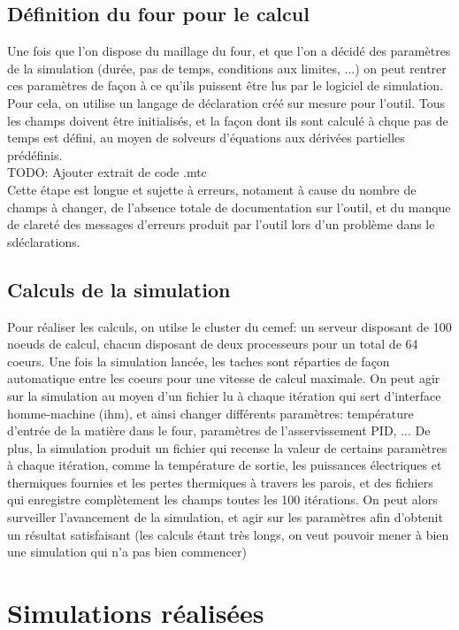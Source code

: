 \documentclass[12pt, a4paper, french, BCOR = 0pt, DIV = 10]{scrartcl}
\begin{document}
    \subsection{Définition du four pour le calcul}
    Une fois que l'on dispose du maillage du four, et que l'on a décidé des paramètres de la simulation (durée, pas de temps, conditions aux limites, ...) on peut rentrer ces paramètres de façon à ce qu'ils puissent être lus par le logiciel de simulation. Pour cela, on utilise un langage de déclaration créé sur mesure pour l'outil. Tous les champs doivent être initialisés, et la façon dont ils sont calculé à chque pas de temps est défini, au moyen de solveurs d'équations aux dérivées partielles prédéfinis.\\
    TODO: Ajouter extrait de code .mtc\\
    Cette étape est longue et sujette à erreurs, notament à cause du nombre de champs à changer, de l'absence totale de documentation sur l'outil, et du manque de clareté des messages d'erreurs produit par l'outil lors d'un problème dans le sdéclarations.

    \subsection{Calculs de la simulation}
    Pour réaliser les calculs, on utilse le cluster du cemef: un serveur disposant de 100 noeuds de calcul, chacun disposant de deux processeurs pour un total de 64 coeurs. Une fois la simulation lancée, les taches sont réparties de façon automatique entre les coeurs pour une vitesse de calcul maximale. On peut agir sur la simulation au moyen d'un fichier lu à chaque itération qui sert d'interface homme-machine (ihm), et ainsi changer différents paramètres: température d'entrée de la matière dans le four, paramètres de l'asservissement PID, ... De plus, la simulation produit un fichier qui recense la valeur de certains paramètres à chaque itération, comme la température de sortie, les puissances électriques et thermiques fournies et les pertes thermiques à travers les parois, et des fichiers qui enregistre complètement les champs toutes les 100 itérations. On peut alors surveiller l'avancement de la simulation, et agir sur les paramètres afin d'obtenit un résultat satisfaisant (les calculs étant très longs, on veut pouvoir mener à bien une simulation qui n'a pas bien commencer)

    
    \section{Simulations réalisées}
    
\end{document}
